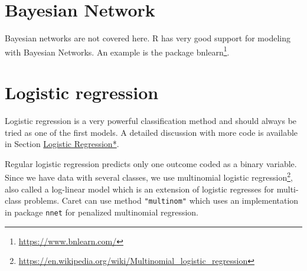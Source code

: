 \documentclass[
  notitlepage]{book}
\DeclareRobustCommand{\href}[2]{#2\footnote{\url{#1}}}
\begin{document}
\hypertarget{bayesian-network}{%
\section{Bayesian Network}\label{bayesian-network}}

Bayesian networks are not covered here. R has very good
support for modeling with Bayesian Networks. An example is
the package \href{https://www.bnlearn.com/}{bnlearn}.

\hypertarget{logistic-regression}{%
\section{Logistic regression}\label{logistic-regression}}

Logistic regression is a very powerful classification method
and should always be tried as
one of the first models.
A detailed discussion with more code is available in Section
\protect\hyperlink{logistic-regression-1}{Logistic Regression*}.

Regular logistic regression predicts only one outcome coded as a
binary variable. Since we have data with several
classes, we use \href{https://en.wikipedia.org/wiki/Multinomial_logistic_regression}{multinomial logistic regression},
also called a log-linear model
which is an extension of logistic regresses for multi-class problems.
Caret can use method \texttt{"multinom"} which uses an implementation
in package \texttt{nnet} for penalized multinomial regression.
\end{document}
